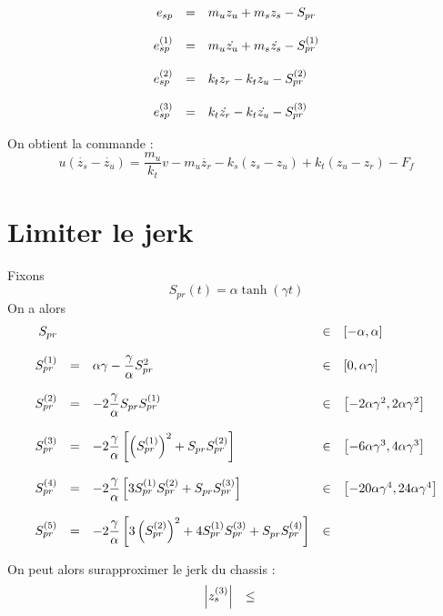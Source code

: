 \documentclass[10pt]{article}
\begin{document}
\[
\begin{array}{r c l}
  e_{sp} &=& m_u z_u + m_s z_s - S_{pr} \\
  \\
  e_{sp}^{(1)} &=& m_u \dot{z_u} + m_s \dot{z_s} - S_{pr}^{(1)} \\
  \\
  e_{sp}^{(2)} &=& k_t z_r - k_t z_u - S_{pr}^{(2)} \\
  \\
  e_{sp}^{(3)} &=& k_t \dot{z_r} - k_t \dot{z_u} - S_{pr}^{(3)} \\
\end{array}
\]

On obtient la commande :
\[
u \left( \dot{z_s} - \dot{z_u} \right) = \dfrac{m_u}{k_t} v - m_u \ddot{z_r} - k_s \left( z_s - z_u \right) + k_t \left( z_u - z_r \right) - F_f
\]

\section{Limiter le jerk}

Fixons
\[
S_{pr}(t) = \alpha \tanh(\gamma t)
\]
On a alors
\[
\begin{array}{r c l l l}
  S_{pr} && &\in&\left[ -\alpha, \alpha \right] \\
  \\
  S_{pr}^{(1)} &=& \alpha \gamma - \dfrac{\gamma}{\alpha} S_{pr}^2 &\in& \left[0, \alpha \gamma \right] \\
  \\
  S_{pr}^{(2)} &=& -2 \dfrac{\gamma}{\alpha} S_{pr} S_{pr}^{(1)} &\in& \left[ -2 \alpha \gamma^{2}, 2 \alpha \gamma^{2} \right] \\
  \\
  S_{pr}^{(3)} &=& -2 \dfrac{\gamma}{\alpha} \left[ \left( S_{pr}^{(1)} \right)^2 + S_{pr} S_{pr}^{(2)} \right] &\in& \left[ -6 \alpha \gamma^{3}, 4 \alpha \gamma^{3} \right] \\
  \\
  S_{pr}^{(4)} &=& -2 \dfrac{\gamma}{\alpha} \left[ 3 S_{pr}^{(1)} S_{pr}^{(2)} + S_{pr} S_{pr}^{(3)} \right] &\in& \left[ -20 \alpha \gamma^4, 24 \alpha \gamma^4 \right] \\
  \\
  S_{pr}^{(5)} &=& -2 \dfrac{\gamma}{\alpha} \left[ 3 \left( S_{pr}^{(2)} \right)^{2} + 4 S_{pr}^{(1)} S_{pr}^{(3)} + S_{pr} S_{pr}^{(4)} \right] &\in& \\
\end{array}
\]

On peut alors surapproximer le jerk du chassis :
\[
\begin{array}{r c l}
  \left| z_s^{(3)} \right| &\leq& \\
\end{array}
\]
\end{document}

